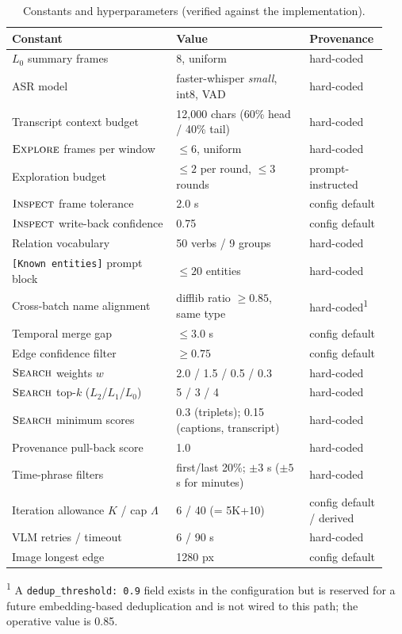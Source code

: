 \begin{table}[t]
  \centering
  \small
  \caption{Constants and hyperparameters (verified against the implementation).}
  \label{tab:constants}
  \begin{tabular}{@{}p{0.42\linewidth}p{0.34\linewidth}p{0.18\linewidth}@{}}
    \toprule
    Constant & Value & Provenance \\
    \midrule
    $L_0$ summary frames & 8, uniform & hard-coded \\
    ASR model & faster-whisper \emph{small}, int8, VAD & hard-coded \\
    Transcript context budget & 12,000 chars (60\% head / 40\% tail) & hard-coded \\
    $\textsc{Explore}$ frames per window & $\leq 6$, uniform & hard-coded \\
    Exploration budget & $\leq 2$ per round, $\leq 3$ rounds & prompt-instructed \\
    $\textsc{Inspect}$ frame tolerance & 2.0 s & config default \\
    $\textsc{Inspect}$ write-back confidence & 0.75 & config default \\
    Relation vocabulary & 50 verbs / 9 groups & hard-coded \\
    \texttt{[Known entities]} prompt block & $\leq 20$ entities & hard-coded \\
    Cross-batch name alignment & difflib ratio $\geq 0.85$, same type & hard-coded\textsuperscript{1} \\
    Temporal merge gap & $\leq 3.0$ s & config default \\
    Edge confidence filter & $\geq 0.75$ & config default \\
    $\textsc{Search}$ weights $w$ & 2.0 / 1.5 / 0.5 / 0.3 & hard-coded \\
    $\textsc{Search}$ top-$k$ ($L_2$/$L_1$/$L_0$) & 5 / 3 / 4 & hard-coded \\
    $\textsc{Search}$ minimum scores & 0.3 (triplets); 0.15 (captions, transcript) & hard-coded \\
    Provenance pull-back score & 1.0 & hard-coded \\
    Time-phrase filters & first/last 20\%; $\pm 3$ s ($\pm 5$ s for minutes) & hard-coded \\
    Iteration allowance $K$ / cap $\Lambda$ & 6 / 40 (= 5K+10) & config default / derived \\
    VLM retries / timeout & 6 / 90 s & hard-coded \\
    Image longest edge & 1280 px & config default \\
    \bottomrule
  \end{tabular}

  \vspace{2pt}
  {\footnotesize \textsuperscript{1} A \texttt{dedup\_threshold: 0.9} field exists in the configuration but is reserved for a future
  embedding-based deduplication and is not wired to this path; the operative value is 0.85.}
\end{table}
